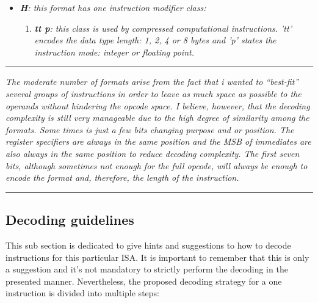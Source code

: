 \begin{itemize}
\begin{enumerate}
                    \end{enumerate}

                \item \textit{\textbf{H}: this format has one instruction modifier class:}

                    \begin{enumerate}

                        \item \textit{\textbf{tt p}: this class is used by compressed computational instructions. 'tt' encodes the data type length: 1, 2, 4 or 8 bytes and 'p' states the instruction mode: integer or floating point.}

                    \end{enumerate}

            \end{itemize}

        \par\noindent\rule{\textwidth}{0.4pt}
        \textit{The moderate number of formats arise from the fact that i wanted to ``best-fit'' several groups of instructions in order to leave as much space as possible to the operands without hindering the opcode space. I believe, however, that the decoding complexity is still very manageable due to the high degree of similarity among the formats. Some times is just a few bits changing purpose and or position. The register specifiers are always in the same position and the MSB of immediates are also always in the same position to reduce decoding complexity. The first seven bits, although sometimes not enough for the full opcode, will always be enough to encode the format and, therefore, the length of the instruction.}
        \par\noindent\rule{\textwidth}{0.4pt}

        \subsection{Decoding guidelines}

            \vspace{10pt}

            This sub section is dedicated to give hints and suggestions to how to decode instructions for this particular ISA. It is important to remember that this is only a suggestion and it's not mandatory to strictly perform the decoding in the presented manner. Nevertheless, the proposed decoding strategy for a one instruction is divided into multiple steps:

